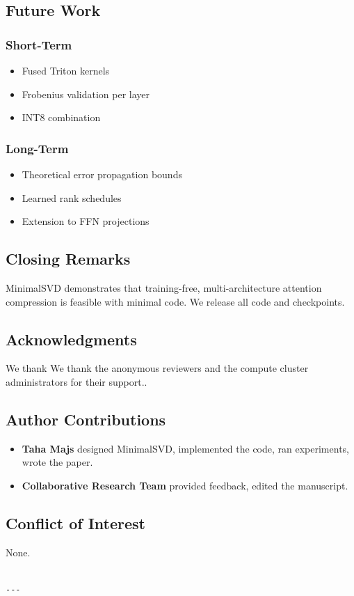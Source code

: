 \subsection{Future Work}

\subsubsection{Short-Term}
\begin{itemize}
\item Fused Triton kernels
\item Frobenius validation per layer
\item INT8 combination

\end{itemize}
\subsubsection{Long-Term}
\begin{itemize}
\item Theoretical error propagation bounds
\item Learned rank schedules
\item Extension to FFN projections

\end{itemize}
\subsection{Closing Remarks}

MinimalSVD demonstrates that training-free, multi-architecture attention 
compression is feasible with minimal code. We release all code and 
checkpoints.

\subsection{Acknowledgments}

We thank We thank the anonymous reviewers and the compute cluster administrators for their support..

\subsection{Author Contributions}

\begin{itemize}
\item \textbf{Taha Majs} designed MinimalSVD, implemented the code, ran experiments,
  wrote the paper.
\item \textbf{Collaborative Research Team} provided feedback, edited the manuscript.

\end{itemize}
\subsection{Conflict of Interest}

None.
\begin{lstlisting}

---
\end{lstlisting}